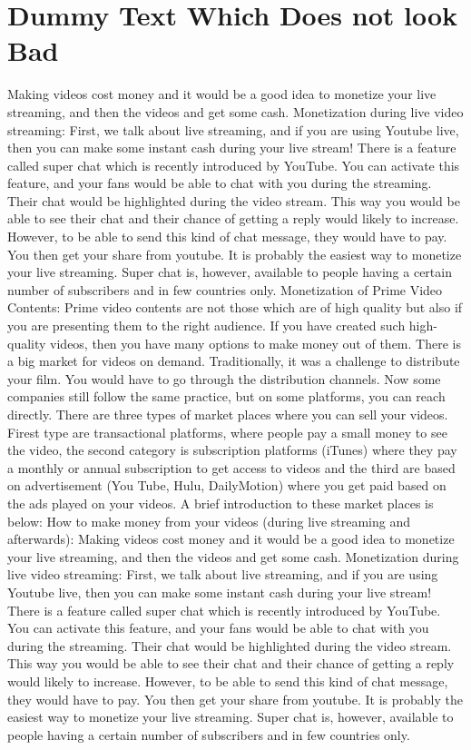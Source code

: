 \documentclass{book}
\begin{document}
\section{Dummy Text Which Does not look Bad}
Making videos cost money and it would be a good idea to monetize your live streaming, and then the videos and get some cash.
Monetization during live video streaming:
First, we talk about live streaming, and if you are using Youtube live, then you can make some instant cash during your live stream! There is a feature called super chat which is recently introduced by YouTube.  You can activate this feature, and your fans would be able to chat with you during the streaming. Their chat would be highlighted during the video stream. This way you would be able to see their chat and their chance of getting a reply would likely to increase. However,  to be able to send this kind of chat message, they would have to pay.  You then get your share from youtube. It is probably the easiest way to monetize your live streaming. Super chat is, however, available to people having a certain number of subscribers and in few countries only.
Monetization of Prime Video Contents:
Prime video contents are not those which are of high quality but also if you are presenting them to the right audience.  If you have created such high-quality videos, then you have many options to make money out of them.  There is a big market for videos on demand. Traditionally, it was a challenge to distribute your film. You would have to go through the distribution channels. Now some companies still follow the same practice, but on some platforms, you can reach directly. There are three types of market places where you can sell your videos. Firest type are transactional platforms, where people pay a small money to see the video, the second category is subscription platforms (iTunes) where they pay a monthly or annual subscription to get access to videos and the third are based on advertisement (You Tube, Hulu, DailyMotion) where you get paid based on the ads played on your videos. A brief introduction to these market places is below:
How to make money from your videos (during live streaming and afterwards):
Making videos cost money and it would be a good idea to monetize your live streaming, and then the videos and get some cash.
Monetization during live video streaming:
First, we talk about live streaming, and if you are using Youtube live, then you can make some instant cash during your live stream! There is a feature called super chat which is recently introduced by YouTube.  You can activate this feature, and your fans would be able to chat with you during the streaming. Their chat would be highlighted during the video stream. This way you would be able to see their chat and their chance of getting a reply would likely to increase. However,  to be able to send this kind of chat message, they would have to pay.  You then get your share from youtube. It is probably the easiest way to monetize your live streaming. Super chat is, however, available to people having a certain number of subscribers and in few countries only.
\end{document}
